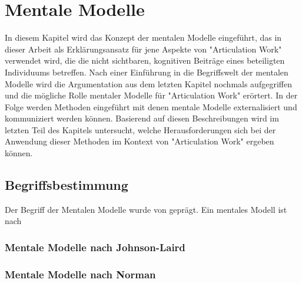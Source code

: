 \chapter{Mentale Modelle}
\label{cha:mentale_modelle}

In diesem Kapitel wird das Konzept der mentalen Modelle eingeführt, das in dieser Arbeit als Erklärungsansatz für jene Aspekte von "Articulation Work" verwendet wird, die die nicht sichtbaren, kognitiven Beiträge eines beteiligten Individuums betreffen. Nach einer Einführung in die Begriffswelt der mentalen Modelle wird die Argumentation aus dem letzten Kapitel nochmals aufgegriffen und die mögliche Rolle mentaler Modelle für "Articulation Work" erörtert. In der Folge werden Methoden eingeführt mit denen mentale Modelle externalisiert und kommuniziert werden können. Basierend auf diesen Beschreibungen wird im letzten Teil des Kapitels untersucht, welche Herausforderungen sich bei der Anwendung dieser Methoden im Kontext von "Articulation Work" ergeben können.

\section{Begriffsbestimmung}
\label{sec:mentalemodelle_begriffsbestimmung}

Der Begriff der Mentalen Modelle wurde von \citet{Johnson-Laird81} geprägt. Ein mentales Modell ist nach 

\subsection{Mentale Modelle nach Johnson-Laird} %
\label{sub:mentale_modelle_nach_johnson_laird}


\subsection{Mentale Modelle nach Norman} %
\label{sub:mentale_modelle_nach_norman}

